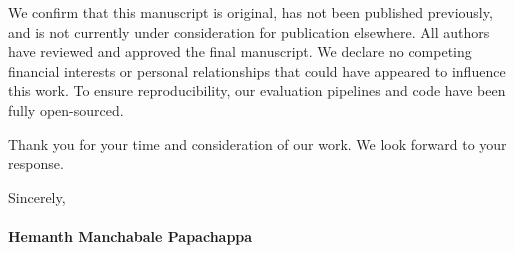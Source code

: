 \documentclass[11pt]{article}
\begin{document}
\vspace{1em}
\noindent
We confirm that this manuscript is original, has not been published previously, and is not currently under consideration for publication elsewhere. All authors have reviewed and approved the final manuscript. We declare no competing financial interests or personal relationships that could have appeared to influence this work. To ensure reproducibility, our evaluation pipelines and code have been fully open-sourced.

\vspace{1em}
\noindent
Thank you for your time and consideration of our work. We look forward to your response.

\vspace{2em}
\noindent
Sincerely,\\
\vspace{1em}\\
\textbf{Hemanth Manchabale Papachappa}\\
\end{document}
